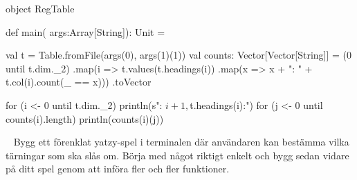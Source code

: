 \SubtaskSolved  \begin{CodeSmall}
object RegTable {
 	def main( args:Array[String]): Unit = {
		val t = Table.fromFile(args(0), args(1)(1))
		val counts: Vector[Vector[String]] =
 			(0 until t.dim._2)
				.map(i => t.values(t.headings(i))
				.map(x => x + ": " + t.col(i).count(_ == x)))
				.toVector

    for (i <- 0 until t.dim._2) {
      println(s"\nColumn: ${i + 1}, ${t.headings(i)}:")
      for (j <- 0 until counts(i).length) {
        println(counts(i)(j))
      }
    }
  }
}
\end{CodeSmall}

\QUESTEND





\QUESTBEGIN

\Task  \what~%
%
%
%
%
%
%
Bygg ett förenklat yatzy-spel i terminalen där användaren kan bestämma vilka tärningar som ska slås om. Börja med något riktigt enkelt och bygg sedan vidare på ditt spel genom att införa fler och fler funktioner.

